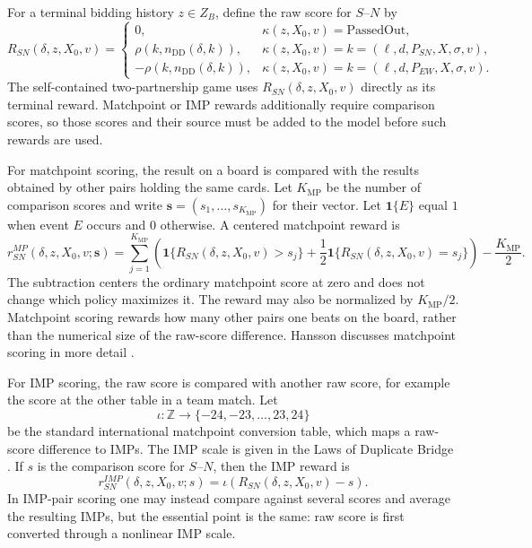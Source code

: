 \documentclass[11pt]{article}
\begin{document}
For a terminal bidding history $z\in Z_B$, define the raw score for $S$--$N$ by
\[
    R_{SN}(\delta,z,X_0,v)=
    \begin{cases}
        0, & \kappa(z,X_0,v)=\mathrm{PassedOut},\\
        \rho(k,n_{\mathrm{DD}}(\delta,k)), & \kappa(z,X_0,v)=k=(\ell,d,P_{SN},X,\sigma,v),\\
        -\rho(k,n_{\mathrm{DD}}(\delta,k)), & \kappa(z,X_0,v)=k=(\ell,d,P_{EW},X,\sigma,v).
    \end{cases}
\]
The self-contained two-partnership game uses $R_{SN}(\delta,z,X_0,v)$ directly as its terminal reward. Matchpoint or IMP rewards additionally require comparison scores, so those scores and their source must be added to the model before such rewards are used.

For matchpoint scoring, the result on a board is compared with the results obtained by other pairs holding the same cards. Let $K_{\mathrm{MP}}$ be the number of comparison scores and write $\mathbf{s}=(s_1,\ldots,s_{K_{\mathrm{MP}}})$ for their vector. Let $\mathbf{1}\{E\}$ equal $1$ when event $E$ occurs and $0$ otherwise. A centered matchpoint reward is
\[
    r_{SN}^{MP}(\delta,z,X_0,v;\mathbf{s})
    =\sum_{j=1}^{K_{\mathrm{MP}}}
    \left(
        \mathbf{1}\{R_{SN}(\delta,z,X_0,v)>s_j\}
        +\frac{1}{2}\mathbf{1}\{R_{SN}(\delta,z,X_0,v)=s_j\}
    \right)
    -\frac{K_{\mathrm{MP}}}{2}.
\]
The subtraction centers the ordinary matchpoint score at zero and does not change which policy maximizes it. The reward may also be normalized by $K_{\mathrm{MP}}/2$. Matchpoint scoring rewards how many other pairs one beats on the board, rather than the numerical size of the raw-score difference. Hansson discusses matchpoint scoring in more detail \cite{hansson2013introductory}.

For IMP scoring, the raw score is compared with another raw score, for example the score at the other table in a team match. Let
\[
    \iota:\mathbb{Z}\to\{-24,-23,\ldots,23,24\}
\]
be the standard international matchpoint conversion table, which maps a raw-score difference to IMPs. The IMP scale is given in the Laws of Duplicate Bridge \cite{acbl2017laws}. If $s$ is the comparison score for $S$--$N$, then the IMP reward is
\[
    r_{SN}^{IMP}(\delta,z,X_0,v;s)=\iota(R_{SN}(\delta,z,X_0,v)-s).
\]
In IMP-pair scoring one may instead compare against several scores and average the resulting IMPs, but the essential point is the same: raw score is first converted through a nonlinear IMP scale.
\end{document}
